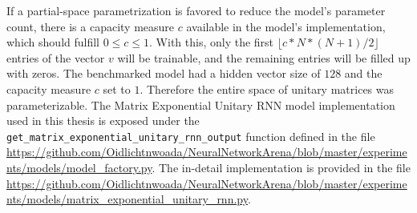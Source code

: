 \documentclass[draft,final]{vutinfth} %
\begin{document}
    If a partial-space parametrization is favored to reduce the model's parameter count, there is a capacity measure $c$ available in the model's implementation, which should fulfill $0 \leq c \leq 1$.
    With this, only the first $\lfloor c*N*(N+1)/2 \rfloor$ entries of the vector $v$ will be trainable, and the remaining entries will be filled up with zeros.
    The benchmarked model had a hidden vector size of $128$ and the capacity measure $c$ set to $1$. Therefore the entire space of unitary matrices was parameterizable.
    The Matrix Exponential Unitary RNN model implementation used in this thesis is exposed under the \texttt{get\_matrix\_exponential\_unitary\_rnn\_output} function defined in the file \url{https://github.com/Oidlichtnwoada/NeuralNetworkArena/blob/master/experiments/models/model_factory.py}.
    The in-detail implementation is provided in the file \url{https://github.com/Oidlichtnwoada/NeuralNetworkArena/blob/master/experiments/models/matrix_exponential_unitary_rnn.py}.
\end{document}
